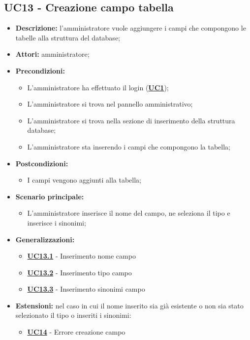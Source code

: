 \documentclass[5pt]{article}
\begin{document}
\subsection{UC13 - Creazione campo tabella}
\label{sec:UC13}
\begin{itemize}
	\item \textbf{Descrizione:} l’amministratore vuole aggiungere i campi che compongono le tabelle alla struttura del database;
	\item \textbf{Attori:} amministratore;
	\item \textbf{Precondizioni:} 
	\begin{itemize}
		\item L’amministratore ha effettuato il login (\hyperref[sec:UC1]{\textbf{UC1}});
		\item L’amministratore si trova nel pannello amministrativo;
		\item L’amministratore si trova nella sezione di inserimento della struttura database;
		\item L’amministratore sta inserendo i campi che compongono la tabella;
	\end{itemize}
	\item \textbf{Postcondizioni:} 
	\begin{itemize}
		\item I campi vengono aggiunti alla tabella;
	\end{itemize}
	\item \textbf{Scenario principale:} 
	\begin{itemize}
		\item L’amministratore inserisce il nome del campo, ne seleziona il tipo e inserisce i sinonimi;
	\end{itemize}
	\item \textbf{Generalizzazioni:} 
	\begin{itemize}
		\item \hyperref[sec:UC13.1]{\textbf{UC13.1}} - Inserimento nome campo
		\item \hyperref[sec:UC13.2]{\textbf{UC13.2}} - Inserimento tipo campo
		\item \hyperref[sec:UC13.3]{\textbf{UC13.3}} - Inserimento sinonimi campo
	\end{itemize}
	\item \textbf{Estensioni:} nel caso in cui il nome inserito sia già esistente o non sia stato selezionato il tipo o inseriti i sinonimi:
	\begin{itemize}
		\item \hyperref[sec:UC14]{\textbf{UC14}} - Errore creazione campo
	\end{itemize}
\end{itemize}
\end{document}
